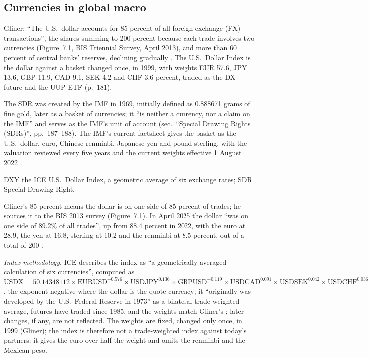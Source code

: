 \subsection{Currencies in global macro}

\begin{qfdefinition}\label{def:us-dollar-dxy-sdr}
 Gliner: ``The U.S.\ dollar accounts for 85 percent of all foreign exchange (FX) transactions'', the shares summing to 200 percent because each trade involves two currencies (Figure~7.1, BIS Triennial Survey, April 2013), and more than 60 percent of central banks' reserves, declining gradually \citep[chap.~7, sec.\ ``The Role of the U.S.\ Dollar'', PDF pp.~180--181]{s7-gliner}. The U.S.\ Dollar Index is the dollar against a basket changed once, in 1999, with weights EUR 57.6, JPY 13.6, GBP 11.9, CAD 9.1, SEK 4.2 and CHF 3.6 percent, traded as the DX future and the UUP ETF (p.~181).

The SDR was created by the IMF in 1969, initially defined as 0.888671 grams of fine gold, later as a basket of currencies; it ``is neither a currency, nor a claim on the IMF'' and serves as the IMF's unit of account (sec.\ ``Special Drawing Rights (SDRs)'', pp.~187--188). The IMF's current factsheet gives the basket as the U.S.\ dollar, euro, Chinese renminbi, Japanese yen and pound sterling, with the valuation reviewed every five years and the current weights effective 1 August 2022 \citep[factsheet dated 7 October 2023]{imf-sdr-factsheet}.

 DXY the ICE U.S.\ Dollar Index, a geometric average of six exchange rates; SDR Special Drawing Right.

 Gliner's 85 percent means the dollar is on one side of 85 percent of trades; he sources it to the BIS 2013 survey (Figure~7.1). In April 2025 the dollar ``was on one side of 89.2\% of all trades'', up from 88.4 percent in 2022, with the euro at 28.9, the yen at 16.8, sterling at 10.2 and the renminbi at 8.5 percent, out of a total of 200 \citep[preliminary results, sec.~2]{bis-triennial-2025}.

\emph{Index methodology}. ICE describes the index as ``a geometrically-averaged calculation of six currencies'', computed as $\text{USDX}=50.14348112\times\text{EURUSD}^{-0.576}\times\text{USDJPY}^{0.136}\times\text{GBPUSD}^{-0.119}\times\text{USDCAD}^{0.091}\times\text{USDSEK}^{0.042}\times\text{USDCHF}^{0.036}$, the exponent negative where the dollar is the quote currency; it ``originally was developed by the U.S.\ Federal Reserve in 1973'' as a bilateral trade-weighted average, futures have traded since 1985, and the weights match Gliner's \citep[FAQ, June 2015, p.~2]{ice-dxy-faq}; later changes, if any, are not reflected. The weights are fixed, changed only once, in 1999 (Gliner); the index is therefore not a trade-weighted index against today's partners: it gives the euro over half the weight and omits the renminbi and the Mexican peso.


\end{qfdefinition}
